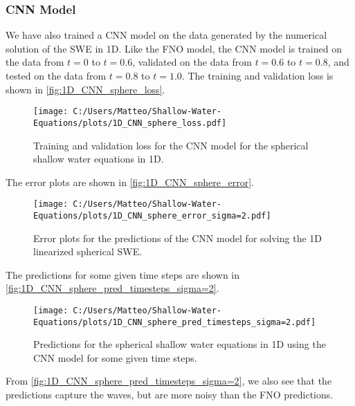 \subsubsection*{CNN Model}
We have also trained a CNN model on the data generated by the numerical solution of the SWE in 1D.
Like the FNO model, the CNN model is trained on the data from $t = 0$ to $t = 0.6$, validated on the data from $t = 0.6$ to $t = 0.8$, and tested on the data from $t = 0.8$ to $t = 1.0$.
The training and validation loss is shown in \autoref{fig:1D_CNN_sphere_loss}.
\begin{figure}[H]
    \centering
    \texttt{[image: C:/Users/Matteo/Shallow-Water-Equations/plots/1D\_CNN\_sphere\_loss.pdf]}
    \caption{Training and validation loss for the CNN model for the spherical shallow water equations in 1D.}\label{fig:1D_CNN_sphere_loss}
\end{figure}
The error plots are shown in \autoref{fig:1D_CNN_sphere_error}.
\begin{figure}[H]
    \centering
    \texttt{[image: C:/Users/Matteo/Shallow-Water-Equations/plots/1D\_CNN\_sphere\_error\_sigma=2.pdf]}
    \caption{Error plots for the predictions of the CNN model for solving the 1D linearized spherical SWE.}\label{fig:1D_CNN_sphere_error}
\end{figure}
The predictions for some given time steps are shown in \autoref{fig:1D_CNN_sphere_pred_timesteps_sigma=2}.
\begin{figure}[H]
    \centering
    \texttt{[image: C:/Users/Matteo/Shallow-Water-Equations/plots/1D\_CNN\_sphere\_pred\_timesteps\_sigma=2.pdf]}
    \caption{Predictions for the spherical shallow water equations in 1D using the CNN model for some given time steps.}\label{fig:1D_CNN_sphere_pred_timesteps_sigma=2}
\end{figure}
From \autoref{fig:1D_CNN_sphere_pred_timesteps_sigma=2}, we also see that the predictions capture the waves, but are more noisy than the FNO predictions.


